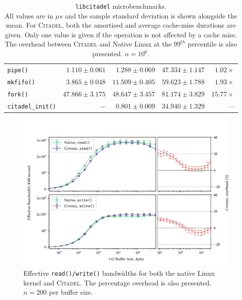 \begin{table}
\begin{tabular}{l@{\hskip 0.15in} r@{\hskip 0.6in} r@{\hskip 0.35in} r@{\hskip 0.35in} r}
        \midrule 
        \texttt{pipe()} & $1.110\pm0.061$ & $1.288\pm0.069$ & $47.334\pm1.147$ & $1.02\times$\\
        \texttt{mkfifo()} & $3.865\pm0.048$ & $11.509\pm0.405$ & $59.623\pm1.788$ & $1.93\times$\\

        \midrule 
        \texttt{fork()} & $47.866\pm3.175$ & $48.647\pm3.457$ & $81.174\pm3.829$ & $15.77\times$\\
        \texttt{citadel\_init()} & $-$ & $0.801\pm0.009$ & $34.940\pm1.329$ & ---\\
        \bottomrule
    \end{tabular}
    \vspace{5mm}
    \captionsetup{justification=centering}
    \caption[\texttt{libcitadel} microbenchmarks]{\texttt{libcitadel} microbenchmarks. \\ All values are in $\mu s$ and the sample standard deviation is shown alongside the mean. For \textsc{Citadel}, both the amortised and average cache-miss durations are given. Only one value is given if the operation is not affected by a cache miss. The overhead between \textsc{Citadel} and Native Linux at the $99^{th}$ percentile is also presented. $n=10^6$.}
    \label{table:syscall-microbenchmarks}
\end{table}

\begin{figure}[h]
    \centering
    \includegraphics[width=\linewidth]{figures/graphs/io.pdf}
    \vspace{-5mm}
    \captionsetup{justification=centering}
    \caption[Effective \texttt{read()/write()} bandwidths for both the native Linux kernel and \textsc{Citadel}.]{Effective \texttt{read()/write()} bandwidths for both the native Linux kernel and \textsc{Citadel}. The percentage overhead is also presented. $n=200$ per buffer size.}
    \label{fig:io-graph}
\end{figure}

